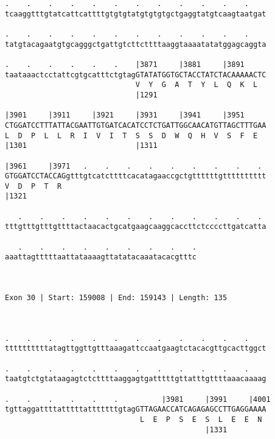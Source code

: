 \documentclass{article}
\begin{document}
\begin{Verbatim}
.    .    .    .    .    .    .    .    .    .    .    .    
tcaaggtttgtatcattcattttgtgtgtatgtgtgtgctgaggtatgtcaagtaatgat
                                                            
.    .    .    .    .    .    .    .    .    .    .    .    
tatgtacagaatgtgcagggctgattgtcttcttttaaggtaaaatatatggagcaggta
                                                            
.    .    .    .    .    .    |3871     |3881     |3891     
taataaactcctattcgtgcatttctgtagGTATATGGTGCTACCTATCTACAAAAACTC
                              V  Y  G  A  T  Y  L  Q  K  L  
                              |1291                         
  
|3901     |3911     |3921     |3931     |3941     |3951     
CTGGATCCTTTATTACGAATTGTGATCACATCCTCTGATTGGCAACATGTTAGCTTTGAA
L  D  P  L  L  R  I  V  I  T  S  S  D  W  Q  H  V  S  F  E  
|1301                         |1311                         
  
|3961     |3971   .    .    .    .    .    .    .    .    . 
GTGGATCCTACCAGgtttgtcatcttttcacatagaaccgctgttttttgtttttttttt
V  D  P  T  R                                               
|1321                                                       
  
   .    .    .    .    .    .    .    .    .    .    .    . 
tttgtttgtttgttttactaacactgcatgaagcaaggcaccttctccccttgatcatta
                                                            
   .    .    .    .    .    .    .    .    .
aaattagtttttaattataaaagttatatacaaatacacgtttc
                                            
                                            
 
Exon 30 | Start: 159008 | End: 159143 | Length: 135



.    .    .    .    .    .    .    .    .    .    .    .    
ttttttttttatagttggttgtttaaagattccaatgaagtctacacgttgcacttggct
                                                            
.    .    .    .    .    .    .    .    .    .    .    .    
taatgtctgtataagagtctcttttaaggagtgatttttgttatttgttttaaacaaaag
                                                            
.    .    .    .    .    .          |3981     |3991     |4001
tgttaggattttatttttatttttttgtagGTTAGAACCATCAGAGAGCCTTGAGGAAAA
                               L  E  P  S  E  S  L  E  E  N 
                                              |1331         
  

\end{Verbatim}
\end{document}
